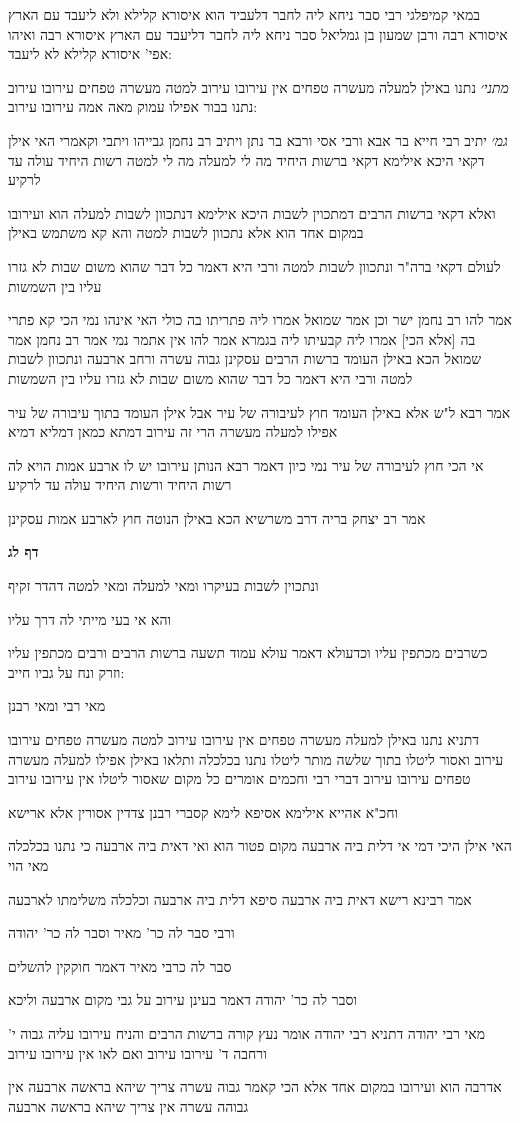 \documentclass[12pt, openany]{book}
\newcommand{\sethebfont}{
\fontsize{10.5pt}{21.0pt} \selectfont
}
\newcommand{\textblock}[1]{
{\sethebfont #1\\}	
}
\newcommand{\sectname}{}
\newcommand{\newsection}[1]{
	\addcontentsline{toc}{section}{#1}
	\renewcommand{\sectname}{#1}	
	\vspace{-\baselineskip}
	\begin{center}
		\textbf{%
\fontsize{16pt}{16pt}\selectfont
			#1}
	\end{center}
	\vspace{-\baselineskip}
	\nopagebreak
}
\begin{document}
\textblock{במאי קמיפלגי רבי סבר ניחא ליה לחבר דלעביד הוא איסורא קלילא ולא ליעבד עם הארץ איסורא רבה ורבן שמעון בן גמליאל סבר ניחא ליה לחבר דליעבד עם הארץ איסורא רבה ואיהו אפי' איסורא קלילא לא ליעבד:}
\textblock{{\large\emph{מתני׳}} נתנו באילן למעלה מעשרה טפחים אין עירובו עירוב למטה מעשרה טפחים עירובו עירוב נתנו בבור אפילו עמוק מאה אמה עירובו עירוב:}
\textblock{{\large\emph{גמ׳}} יתיב רבי חייא בר אבא ורבי אסי ורבא בר נתן ויתיב רב נחמן גבייהו ויתבי וקאמרי האי אילן דקאי היכא אילימא דקאי ברשות היחיד מה לי למעלה מה לי למטה רשות היחיד עולה עד לרקיע}
\textblock{ואלא דקאי ברשות הרבים דמתכוין לשבות היכא אילימא דנתכוון לשבות למעלה הוא ועירובו במקום אחד הוא אלא נתכוון לשבות למטה והא קא משתמש באילן}
\textblock{לעולם דקאי ברה"ר ונתכוון לשבות למטה ורבי היא דאמר כל דבר שהוא משום שבות לא גזרו עליו בין השמשות}
\textblock{אמר להו רב נחמן ישר וכן אמר שמואל אמרו ליה פתריתו בה כולי האי אינהו נמי הכי קא פתרי בה [אלא הכי] אמרו ליה קבעיתו ליה בגמרא אמר להו אין אתמר נמי אמר רב נחמן אמר שמואל הכא באילן העומד ברשות הרבים עסקינן גבוה עשרה ורחב ארבעה ונתכוון לשבות למטה ורבי היא דאמר כל דבר שהוא משום שבות לא גזרו עליו בין השמשות}
\textblock{אמר רבא ל"ש אלא באילן העומד חוץ לעיבורה של עיר אבל אילן העומד בתוך עיבורה של עיר אפילו למעלה מעשרה הרי זה עירוב דמתא כמאן דמליא דמיא}
\textblock{אי הכי חוץ לעיבורה של עיר נמי כיון דאמר רבא הנותן עירובו יש לו ארבע אמות הויא לה רשות היחיד ורשות היחיד עולה עד לרקיע}
\textblock{אמר רב יצחק בריה דרב משרשיא הכא באילן הנוטה חוץ לארבע אמות עסקינן}
\newsection{דף לג}
\textblock{ונתכוין לשבות בעיקרו ומאי למעלה ומאי למטה דהדר זקיף}
\textblock{והא אי בעי מייתי לה דרך עליו}
\textblock{כשרבים מכתפין עליו וכדעולא דאמר עולא עמוד תשעה ברשות הרבים ורבים מכתפין עליו וזרק ונח על גביו חייב:}
\textblock{מאי רבי ומאי רבנן}
\textblock{דתניא נתנו באילן למעלה מעשרה טפחים אין עירובו עירוב למטה מעשרה טפחים עירובו עירוב ואסור ליטלו בתוך שלשה מותר ליטלו נתנו בכלכלה ותלאו באילן אפילו למעלה מעשרה טפחים עירובו עירוב דברי רבי וחכמים אומרים כל מקום שאסור ליטלו אין עירובו עירוב}
\textblock{וחכ"א אהייא אילימא אסיפא לימא קסברי רבנן צדדין אסורין אלא ארישא}
\textblock{האי אילן היכי דמי אי דלית ביה ארבעה מקום פטור הוא ואי דאית ביה ארבעה כי נתנו בכלכלה מאי הוי}
\textblock{אמר רבינא רישא דאית ביה ארבעה סיפא דלית ביה ארבעה וכלכלה משלימתו לארבעה}
\textblock{ורבי סבר לה כר' מאיר וסבר לה כר' יהודה}
\textblock{סבר לה כרבי מאיר דאמר חוקקין להשלים}
\textblock{וסבר לה כר' יהודה דאמר בעינן עירוב על גבי מקום ארבעה וליכא}
\textblock{מאי רבי יהודה דתניא רבי יהודה אומר נעץ קורה ברשות הרבים והניח עירובו עליה גבוה י' ורחבה ד' עירובו עירוב ואם לאו אין עירובו עירוב}
\textblock{אדרבה הוא ועירובו במקום אחד אלא הכי קאמר גבוה עשרה צריך שיהא בראשה ארבעה אין גבוהה עשרה אין צריך שיהא בראשה ארבעה}
\end{document}
